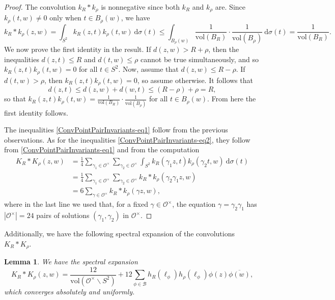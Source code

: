 \documentclass[11pt]{amsart}
\newtheorem{lemma}[theorem]{Lemma}
\theoremstyle{definition}
\begin{document}
\begin{proof}
The convolution $k_{R}*k_{\rho}$ is nonnegative since both $k_{R}$ and $k_{\rho}$ are. Since $k_{\rho}(t,w)\neq 0$ only when $t \in B_{\rho}(w)$, we have $$ k_{R}*k_{\rho} (z,w) = \int_{S^2} k_{R} (z,t) k_{\rho}(t,w) \: \mathrm{d}\sigma(t) \leq \int_{B_{\rho}(w)} \frac{1}{\mathrm{vol}(B_{R})} \cdot \frac{1}{\mathrm{vol}(B_{\rho})} \: \mathrm{d}\sigma(t) = \frac{1}{\mathrm{vol}(B_{R})}. $$ We now prove the first identity in the result. If $d(z,w)> R+\rho$, then the inequalities $d(z,t)\leq R$ and $d(t,w)\leq \rho$ cannot be true simultaneously, and so $k_{R}(z,t) k_{\rho}(t,w)=0$ for all $t\in S^2$. Now, assume that $d(z,w) \leq R-\rho$. If $d(t,w)>\rho$, then $k_{R}(z,t)k_{\rho}(t,w)=0$, so assume otherwise. It follows that $$ d(z,t) \leq d(z,w) + d(w,t) \leq (R-\rho) + \rho = R, $$ so that $k_{R}(z,t)k_{\rho}(t,w) = \frac{1}{\mathrm{vol}(B_{R})} \cdot \frac{1}{\mathrm{vol}(B_{\rho})}$ for all $t\in B_{\rho}(w)$. From here the first identity follows.

The inequalities \eqref{ConvPointPairInvariants-eq1} follow from the previous observations. As for the inequalities \eqref{ConvPointPairInvariants-eq2}, they follow from \eqref{ConvPointPairInvariants-eq1} and from the computation 
\begin{align}
    K_{R}*K_{\rho}(z,w) &= \frac{1}{4} \sum_{\gamma_1 \in \mathcal{O}^{\times}} \sum_{\gamma_2 \in \mathcal{O}^{\times}} \int_{S^2} k_{R}(\gamma_1 z,t) k_{\rho}(\gamma_2 t,w) \: \mathrm{d}\sigma(t) \label{CompKtok} \\
    &= \frac{1}{4} \sum_{\gamma_1 \in \mathcal{O}^{\times}} \sum_{\gamma_2 \in \mathcal{O}^{\times}} k_{R}*k_{\rho}(\gamma_2 \gamma_1 z, w) \nonumber \\
    &= 6 \sum_{\gamma \in \mathcal{O}^{\times}} k_{R}*k_{\rho}(\gamma z,w), \nonumber
\end{align}
where in the last line we used that, for a fixed $\gamma \in \mathcal{O}^{\times}$, the equation $\gamma = \gamma_2 \gamma_1$ has $|\mathcal{O}^{\times}| = 24$ pairs of solutions $(\gamma_1, \gamma_2)$ in $\mathcal{O}^{\times}$.
\end{proof}

Additionally, we have the following spectral expansion of the convolutions $K_{R}*K_{\rho}$.

\begin{lemma}\label{SpecExpPointPairInvariants}
We have the spectral expansion $$ K_{R}*K_{\rho}(z,w) = \frac{12}{\mathrm{vol}(\mathcal{O}^{\times} \backslash S^2)} + 12\sum_{\phi \in \mathcal{B}} h_{R}(\ell_{\phi}) h_{\rho}(\ell_{\phi}) \phi(z) \overline{\phi(w)}, $$ which converges absolutely and uniformly.
\end{lemma}
\end{document}
